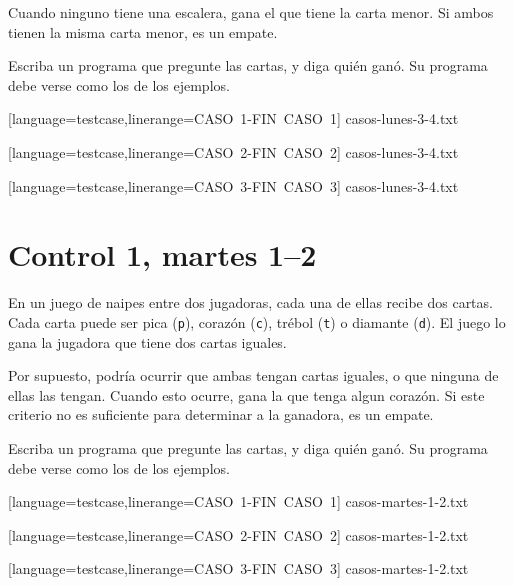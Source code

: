 \documentclass[12pt,spanish,a5paper,landscape]{article}
\begin{document}
  Cuando ninguno tiene una escalera,
  gana el que tiene la carta menor.
  Si ambos tienen la misma carta menor, es un empate.

  Escriba un programa que pregunte las cartas,
  y diga quién ganó.
  Su programa debe verse como los de los ejemplos.

  \begin{minipage}{0.25\textwidth}
      [language=testcase,linerange=CASO\ 1-FIN\ CASO\ 1]%
      {casos-lunes-3-4.txt}
  \end{minipage}
  \hspace{1em}
  \begin{minipage}{0.25\textwidth}
      [language=testcase,linerange=CASO\ 2-FIN\ CASO\ 2]%
      {casos-lunes-3-4.txt}
  \end{minipage}
  \hspace{1em}
  \begin{minipage}{0.25\textwidth}
      [language=testcase,linerange=CASO\ 3-FIN\ CASO\ 3]%
      {casos-lunes-3-4.txt}
  \end{minipage}

  \newpage
  \part*{Control 1, martes 1--2}
  \newpage

  En un juego de naipes entre dos jugadoras,
  cada una de ellas recibe dos cartas.
  Cada carta puede ser
  pica (\verb+p+),
  corazón (\verb+c+),
  trébol (\verb+t+) o
  diamante (\verb+d+).
  El juego lo gana la jugadora que tiene dos cartas iguales.

  Por supuesto,
  podría ocurrir que ambas tengan cartas iguales,
  o que ninguna de ellas las tengan.
  Cuando esto ocurre, gana la que tenga algun corazón.
  Si este criterio no es suficiente para determinar a la ganadora,
  es un empate.

  Escriba un programa que pregunte las cartas,
  y diga quién ganó.
  Su programa debe verse como los de los ejemplos.

  \begin{minipage}{0.25\textwidth}
      [language=testcase,linerange=CASO\ 1-FIN\ CASO\ 1]%
      {casos-martes-1-2.txt}
  \end{minipage}
  \hspace{1em}
  \begin{minipage}{0.25\textwidth}
      [language=testcase,linerange=CASO\ 2-FIN\ CASO\ 2]%
      {casos-martes-1-2.txt}
  \end{minipage}
  \hspace{1em}
  \begin{minipage}{0.25\textwidth}
      [language=testcase,linerange=CASO\ 3-FIN\ CASO\ 3]%
      {casos-martes-1-2.txt}
  \end{minipage}
\end{document}
